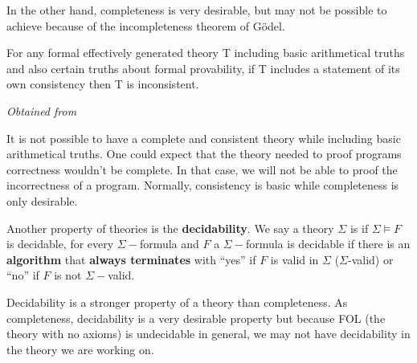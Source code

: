 In the other hand, completeness is very desirable, but may not be possible to achieve because of the incompleteness theorem of Gödel.


\begin{theorem}


For any formal effectively generated theory T including basic arithmetical truths and also certain truths about formal provability, if T includes a statement of its own consistency then T is inconsistent.


\textit{Obtained from }
\end{theorem}




It is not possible to have a complete and consistent theory while including basic arithmetical truths. 
%
One could expect that the theory needed to proof programs correctness wouldn't be complete. 
%
In that case, we will not be able to proof the incorrectness of a program.
%
Normally, consistency is basic while completeness is only desirable.

Another property of theories is the \textbf{decidability}. We say a theory $\Sigma$ is  if $\Sigma \vDash F$ is decidable, for every $\Sigma-$formula 
and 
$F$ a $\Sigma-$formula is decidable if there is an \textbf{algorithm} that \textbf{always terminates} with ``yes'' if $F$ is valid in $\Sigma$ ($\Sigma$-valid) or ``no'' if $F$ is not $\Sigma-$valid.


Decidability is a stronger property of a theory than completeness. 
%
As completeness, decidability is a very desirable property but because \gls{FOL} (the theory with no axioms) is undecidable in general, we may not have decidability in the theory we are working on.



